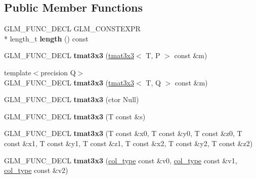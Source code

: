 \subsection*{Public Member Functions}
\begin{DoxyCompactItemize}
\item 
\hypertarget{structglm_1_1detail_1_1tmat3x3_a5e59538a93a3039a7c6d58ce50bfd310}{G\-L\-M\-\_\-\-F\-U\-N\-C\-\_\-\-D\-E\-C\-L G\-L\-M\-\_\-\-C\-O\-N\-S\-T\-E\-X\-P\-R \\*
length\-\_\-t {\bfseries length} () const }\label{structglm_1_1detail_1_1tmat3x3_a5e59538a93a3039a7c6d58ce50bfd310}

\item 
\hypertarget{structglm_1_1detail_1_1tmat3x3_ad29c55dfadf40179fd4d911535465f6c}{G\-L\-M\-\_\-\-F\-U\-N\-C\-\_\-\-D\-E\-C\-L {\bfseries tmat3x3} (\hyperlink{structglm_1_1detail_1_1tmat3x3}{tmat3x3}$<$ T, P $>$ const \&m)}\label{structglm_1_1detail_1_1tmat3x3_ad29c55dfadf40179fd4d911535465f6c}

\item 
\hypertarget{structglm_1_1detail_1_1tmat3x3_a088a58e6773a067fdf873610d46283c1}{{\footnotesize template$<$precision Q$>$ }\\G\-L\-M\-\_\-\-F\-U\-N\-C\-\_\-\-D\-E\-C\-L {\bfseries tmat3x3} (\hyperlink{structglm_1_1detail_1_1tmat3x3}{tmat3x3}$<$ T, Q $>$ const \&m)}\label{structglm_1_1detail_1_1tmat3x3_a088a58e6773a067fdf873610d46283c1}

\item 
\hypertarget{structglm_1_1detail_1_1tmat3x3_ac542e26b78b276165616b75632e45f4b}{G\-L\-M\-\_\-\-F\-U\-N\-C\-\_\-\-D\-E\-C\-L {\bfseries tmat3x3} (ctor Null)}\label{structglm_1_1detail_1_1tmat3x3_ac542e26b78b276165616b75632e45f4b}

\item 
\hypertarget{structglm_1_1detail_1_1tmat3x3_a4c126cf2520005853e4ce6e4689906c6}{G\-L\-M\-\_\-\-F\-U\-N\-C\-\_\-\-D\-E\-C\-L {\bfseries tmat3x3} (T const \&s)}\label{structglm_1_1detail_1_1tmat3x3_a4c126cf2520005853e4ce6e4689906c6}

\item 
\hypertarget{structglm_1_1detail_1_1tmat3x3_a879a2f7f841b7fc8c801d9bc3e0b272b}{G\-L\-M\-\_\-\-F\-U\-N\-C\-\_\-\-D\-E\-C\-L {\bfseries tmat3x3} (T const \&x0, T const \&y0, T const \&z0, T const \&x1, T const \&y1, T const \&z1, T const \&x2, T const \&y2, T const \&z2)}\label{structglm_1_1detail_1_1tmat3x3_a879a2f7f841b7fc8c801d9bc3e0b272b}

\item 
\hypertarget{structglm_1_1detail_1_1tmat3x3_afcb075377787c4e8252bd0691658239e}{G\-L\-M\-\_\-\-F\-U\-N\-C\-\_\-\-D\-E\-C\-L {\bfseries tmat3x3} (\hyperlink{structglm_1_1detail_1_1tvec3}{col\-\_\-type} const \&v0, \hyperlink{structglm_1_1detail_1_1tvec3}{col\-\_\-type} const \&v1, \hyperlink{structglm_1_1detail_1_1tvec3}{col\-\_\-type} const \&v2)}\label{structglm_1_1detail_1_1tmat3x3_afcb075377787c4e8252bd0691658239e}


\end{DoxyCompactItemize}
